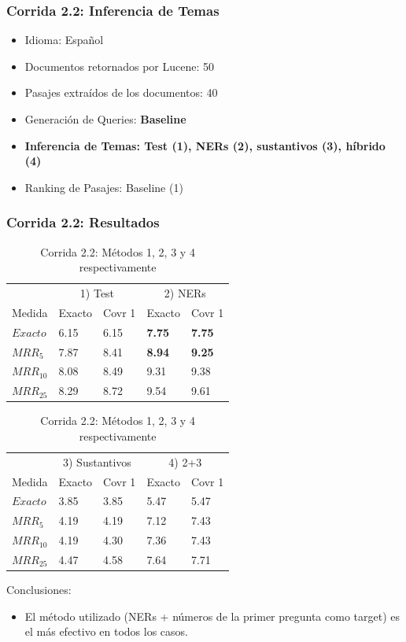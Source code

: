 \begin{frame}
\frametitle{Corrida 2.2: Inferencia de Temas}

\begin{itemize}
  \item Idioma: Español
  \item Documentos retornados por Lucene: 50
  \item Pasajes extraídos de los documentos: 40
  \item Generación de Queries: \textbf{Baseline}
  \item \textbf{{\color{blue}Inferencia de Temas: Test (1), NERs (2), sustantivos (3), híbrido (4)}}
  \item Ranking de Pasajes: Baseline (1)
\end{itemize}

\end{frame}

\begin{frame}
\frametitle{Corrida 2.2: Resultados}

\begin{table}
\centering
\begin{center}
\begin{tabular}{|l | l | l | l | l |}

& \multicolumn{2}{|c|}{1) Test} & \multicolumn{2}{|c|}{2) NERs}  \\ 
Medida & Exacto & Covr 1 & Exacto & Covr 1 \\ 
$Exacto$ & 6.15 & 6.15 & \textbf{{\color{green}7.75}} & \textbf{{\color{green}7.75}} \\ 
$MRR_{5}$ & 7.87 & 8.41 & \textbf{{\color{green}8.94}} & \textbf{{\color{green}9.25}}  \\ 
$MRR_{10}$ & 8.08 & 8.49 & 9.31 & 9.38  \\ 
$MRR_{25}$ & 8.29 & 8.72 & 9.54 & 9.61  \\ 
\end{tabular}

\medskip

\begin{tabular}{|l | l | l | l | l |}

& \multicolumn{2}{|c|}{3) Sustantivos} & \multicolumn{2}{|c|}{4) 2+3} \\ 
Medida & Exacto & Covr 1 & Exacto & Covr 1 \\ 
$Exacto$ & 3.85 & 3.85 & 5.47 & 5.47 \\ 
$MRR_{5}$ & 4.19 & 4.19 & 7.12 & 7.43 \\ 
$MRR_{10}$ & 4.19 & 4.30 & 7.36 & 7.43 \\ 
$MRR_{25}$ & 4.47 & 4.58 & 7.64 & 7.71 \\ 
\end{tabular}
\caption{Corrida 2.2: Métodos 1, 2, 3 y 4 respectivamente}
\end{center}
\end{table}

Conclusiones:
\begin{itemize}
 \item El método utilizado (NERs + números de la primer pregunta como target) es el más efectivo en todos los casos.
\end{itemize}


\end{frame}


